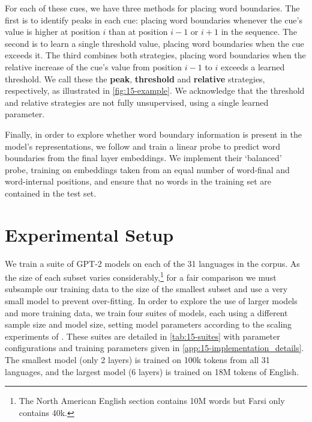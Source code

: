 For each of these cues, we have three methods for placing word boundaries. The first is to identify peaks in each cue: placing word boundaries whenever the cue's value is higher at position $i$ than at position $i-1$ or $i+1$ in the sequence. The second is to learn a single threshold value, placing word boundaries when the cue exceeds it. The third combines both strategies, placing word boundaries when the relative increase of the cue's value from position $i-1$ to $i$ exceeds a learned threshold. We call these the \textbf{peak}, \textbf{threshold} and \textbf{relative} strategies, respectively, as illustrated in \cref{fig:15-example}. We acknowledge that the threshold and relative strategies are not fully unsupervised, using a single learned parameter. %

Finally, in order to explore whether word boundary information is present in the model's representations, we follow \citet{hahn-baroni-2019-tabula} and train a linear probe to predict word boundaries from the final layer embeddings. We implement their `balanced' probe, training on embeddings taken from an equal number of word-final and word-internal positions, and ensure that no words in the training set are contained in the test set. %



\section{Experimental Setup}

We train a suite of GPT-2 models on each of the 31 languages in the \ipachildes corpus. As the size of each subset varies considerably,\footnote{The North American English section contains 10M words but Farsi only contains 40k.} for a fair comparison we must subsample our training data to the size of the smallest subset and use a very small model to prevent over-fitting. In order to explore the use of larger models and more training data, we train four suites of models, each using a different sample size and model size, setting model parameters according to the scaling experiments of \citet{goriely2025}. These suites are detailed in \cref{tab:15-suites} with parameter configurations and training parameters given in \cref{app:15-implementation_details}. The smallest model (only 2 layers) is trained on 100k tokens from all 31 languages, and the largest model (6 layers) is trained on 18M tokens of English. 

